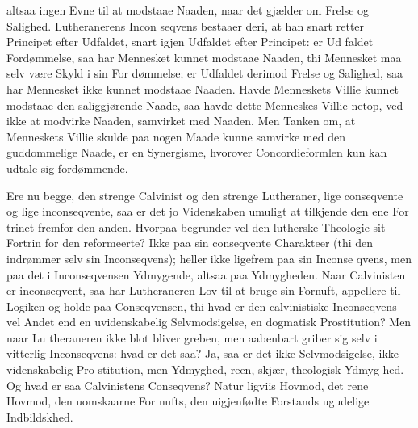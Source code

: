 \documentclass[12pt]{book}
\newcommand{\opage}[1]{\marginnote{\footnotesize\textit{[#1]}}}
\begin{document}
altsaa ingen Evne til at modstaae Naaden, naar det
gjælder om Frelse og Salighed. Lutheranerens Incon\-%
seqvens bestaaer deri, at han snart retter Principet efter
Udfaldet, snart igjen Udfaldet efter Principet: er Ud\-%
faldet Fordømmelse, saa har Mennesket kunnet modstaae
Naaden, thi Mennesket maa selv være Skyld i sin For\-%
dømmelse; er Udfaldet derimod Frelse og Salighed, saa
har Mennesket ikke kunnet modstaae Naaden. Havde
Menneskets Villie kunnet modstaae den saliggjørende
Naade, saa havde dette Menneskes Villie netop, ved
ikke at modvirke Naaden, samvirket med Naaden. Men
Tanken om, at Menneskets Villie skulde paa nogen
Maade kunne samvirke med den guddommelige Naade,
er en Synergisme, hvorover Concordieformlen kun kan
udtale sig fordømmende.

Ere nu begge, den strenge Calvinist og den strenge
Lutheraner, lige conseqvente og lige inconseqvente, saa
er det jo Videnskaben umuligt at tilkjende den ene For\-%
\opage{249}\setcounter{footnote}{0}%
trinet fremfor den anden. Hvorpaa begrunder vel den
lutherske Theologie sit Fortrin for den reformeerte? Ikke
paa sin conseqvente Charakteer (thi den indrømmer selv
sin Inconseqvens); heller ikke ligefrem paa sin Inconse\-%
qvens, men paa det i Inconseqvensen Ydmygende, altsaa
paa Ydmygheden. Naar Calvinisten er inconseqvent, saa
har Lutheraneren Lov til at bruge sin Fornuft, appellere
til Logiken og holde paa Conseqvensen, thi hvad er den
calvinistiske Inconseqvens vel Andet end en uvidenskabelig
Selvmodsigelse, en dogmatisk Prostitution? Men naar Lu\-%
theraneren ikke blot bliver greben, men aabenbart griber
sig selv i vitterlig Inconseqvens: hvad er det saa? Ja,
saa er det ikke Selvmodsigelse, ikke videnskabelig Pro\-%
stitution, men Ydmyghed, reen, skjær, theologisk Ydmyg\-%
hed. Og hvad er saa Calvinistens Conseqvens? Natur\-%
ligviis Hovmod, det rene Hovmod, den uomskaarne For\-%
nufts, den uigjenfødte Forstands ugudelige Indbildskhed.
\end{document}
